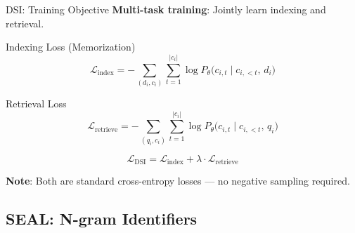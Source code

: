 \documentclass[aspectratio=169,11pt]{beamer}
\begin{document}
\begin{frame}{DSI: Training Objective}
\textbf{Multi-task training}: Jointly learn indexing and retrieval.

\vspace{0.3cm}
\begin{block}{Indexing Loss (Memorization)}
\vspace{-0.3cm}
\[
\mathcal{L}_{\text{index}} = -\sum_{(d_i, c_i)} \sum_{t=1}^{|c_i|} \log P_\theta\bigl(c_{i,t} \mid c_{i,<t},\, d_i\bigr)
\]
\end{block}

\begin{block}{Retrieval Loss}
\vspace{-0.3cm}
\[
\mathcal{L}_{\text{retrieve}} = -\sum_{(q_i, c_i)} \sum_{t=1}^{|c_i|} \log P_\theta\bigl(c_{i,t} \mid c_{i,<t},\, q_i\bigr)
\]
\end{block}

\[
\mathcal{L}_{\text{DSI}} = \mathcal{L}_{\text{index}} + \lambda \cdot \mathcal{L}_{\text{retrieve}}
\]

\textbf{Note}: Both are standard cross-entropy losses --- no negative sampling required.
\end{frame}


\subsection{SEAL: N-gram Identifiers}
\end{document}
